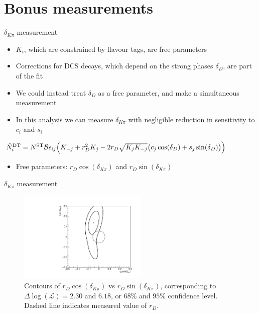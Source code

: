 \documentclass{beamer}
\begin{document}
\section{Bonus measurements}
\begin{frame}{$\delta_{K\pi}$ measurement}
  \begin{itemize}
    \setlength\itemsep{1.0em}
    \item{$K_i$, which are constrained by flavour tags, are free parameters}
    \item{Corrections for DCS decays, which depend on the strong phases $\delta_D$, are part of the fit}
    \item{We could instead treat $\delta_D$ as a free parameter, and make a simultaneous measurement}
    \item{In this analysis we can measure $\delta_{K\pi}$ with negligible reduction in sensitivity to $c_i$ and $s_i$}
  \end{itemize}
  \begin{center}
    $\hat{N}^{\rm DT}_i = N^{\rm ST}\mathcal{B}\epsilon_{ij}\Big(K_{-j} + r_D^2K_j - 2r_D\sqrt{K_jK_{-j}}\big(c_j\cos(\delta_D) + s_j\sin(\delta_D)\big)\Big)$
  \end{center}
  \begin{itemize}
    \item{Free parameters: $r_D\cos(\delta_{K\pi})$ and $r_D\sin(\delta_{K\pi})$}
  \end{itemize}
\end{frame}

\begin{frame}{$\delta_{K\pi}$ measurement}
  \begin{figure}
    \includegraphics[width=0.55\textwidth]{Plots/Contour_DeltaKpi.pdf}
    \caption{Contours of $r_D\cos(\delta_{K\pi})$ vs $r_D\sin(\delta_{K\pi})$, corresponding to $\Delta\log(\mathcal{L}) = 2.30$ and $6.18$, or $68\%$ and $95\%$ confidence level. Dashed line indicates measured value of $r_D$.}
  \end{figure}
\end{frame}
\end{document}

